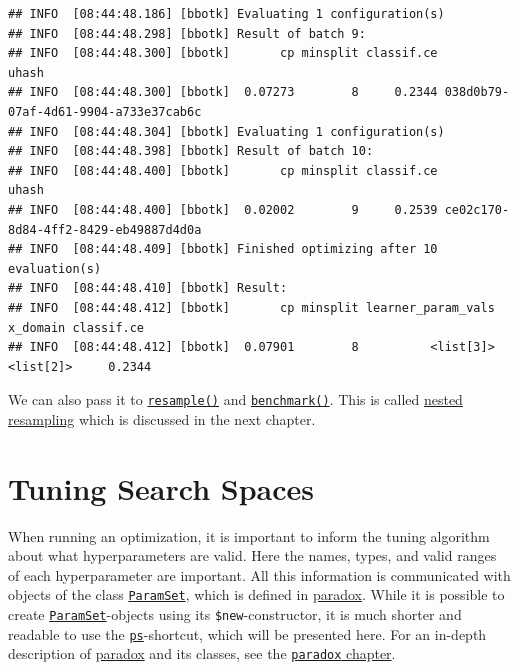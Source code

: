 \documentclass[
]{scrbook}
\begin{document}
\begin{verbatim}
## INFO  [08:44:48.186] [bbotk] Evaluating 1 configuration(s) 
## INFO  [08:44:48.298] [bbotk] Result of batch 9: 
## INFO  [08:44:48.300] [bbotk]       cp minsplit classif.ce                                uhash 
## INFO  [08:44:48.300] [bbotk]  0.07273        8     0.2344 038d0b79-07af-4d61-9904-a733e37cab6c 
## INFO  [08:44:48.304] [bbotk] Evaluating 1 configuration(s) 
## INFO  [08:44:48.398] [bbotk] Result of batch 10: 
## INFO  [08:44:48.400] [bbotk]       cp minsplit classif.ce                                uhash 
## INFO  [08:44:48.400] [bbotk]  0.02002        9     0.2539 ce02c170-8d84-4ff2-8429-eb49887d4d0a 
## INFO  [08:44:48.409] [bbotk] Finished optimizing after 10 evaluation(s) 
## INFO  [08:44:48.410] [bbotk] Result: 
## INFO  [08:44:48.412] [bbotk]       cp minsplit learner_param_vals  x_domain classif.ce 
## INFO  [08:44:48.412] [bbotk]  0.07901        8          <list[3]> <list[2]>     0.2344
\end{verbatim}

We can also pass it to \href{https://mlr3.mlr-org.com/reference/resample.html}{\texttt{resample()}} and \href{https://mlr3.mlr-org.com/reference/benchmark.html}{\texttt{benchmark()}}. This is called \protect\hyperlink{nested-resampling}{nested resampling} which is discussed in the next chapter.

\hypertarget{searchspace}{%
\section{Tuning Search Spaces}\label{searchspace}}

When running an optimization, it is important to inform the tuning algorithm about what hyperparameters are valid.
Here the names, types, and valid ranges of each hyperparameter are important.
All this information is communicated with objects of the class \href{https://paradox.mlr-org.com/reference/ParamSet.html}{\texttt{ParamSet}}, which is defined in \href{https://paradox.mlr-org.com}{paradox}.
While it is possible to create \href{https://paradox.mlr-org.com/reference/ParamSet.html}{\texttt{ParamSet}}-objects using its \texttt{\$new}-constructor, it is much shorter and readable to use the \href{https://paradox.mlr-org.com/reference/ps.html}{\texttt{ps}}-shortcut, which will be presented here.
For an in-depth description of \href{https://paradox.mlr-org.com}{paradox} and its classes, see the \protect\hyperlink{paradox}{\texttt{paradox} chapter}.
\end{document}
